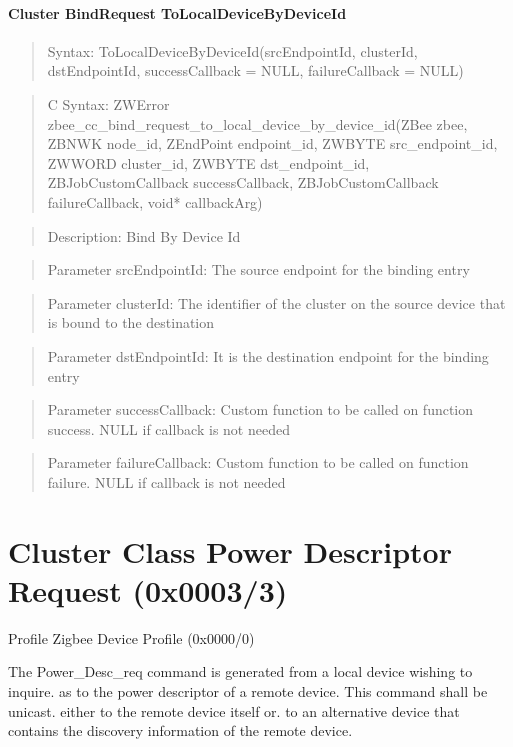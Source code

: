 \paragraph{Cluster BindRequest ToLocalDeviceByDeviceId}
\begin{quote}Syntax: ToLocalDeviceByDeviceId(srcEndpointId, clusterId, dstEndpointId, successCallback = NULL, failureCallback = NULL)\end{quote}
\begin{quote}C Syntax: ZWError zbee\_cc\_bind\_request\_to\_local\_device\_by\_device\_id(ZBee zbee, ZBNWK node\_id, ZEndPoint endpoint\_id, ZWBYTE src\_endpoint\_id, ZWWORD cluster\_id, ZWBYTE dst\_endpoint\_id, ZBJobCustomCallback successCallback, ZBJobCustomCallback failureCallback, void* callbackArg)\end{quote}
\begin{quote}Description: Bind By Device Id\end{quote}
\begin{quote}Parameter srcEndpointId: The source endpoint for the binding entry\end{quote}
\begin{quote}Parameter clusterId: The identifier of the cluster on the source device that is bound to the destination\end{quote}
\begin{quote}Parameter dstEndpointId: It is the destination endpoint for the binding entry\end{quote}
\begin{quote}Parameter successCallback: Custom function to be called on function success. NULL if callback is not needed\end{quote}
\begin{quote}Parameter failureCallback: Custom function to be called on function failure. NULL if callback is not needed\end{quote}



\section{Cluster Class Power Descriptor Request (0x0003/3)}

Profile Zigbee Device Profile (0x0000/0)

The Power\_Desc\_req command is generated from a local device wishing to inquire. as to the power descriptor of a remote device. This command shall be unicast. either to the remote device itself or. to an alternative device that contains the discovery information of the remote device.
